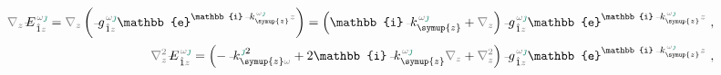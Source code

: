 \begin{subequations} \label{eq:plane_wave_basis-partial_z}
\begin{align}
	\mathcolor{gray}{\nabla_z} \xint{\mathcolor{gray}{-}}{30}{E}^{\;\!\mathcolor{gray}{\omega} \textcolor{PineGreen}{\jmath}}_{\;\! \hat{1} \mathcolor{gray}{z}} = \mathcolor{gray}{\nabla_z} \left( \xint{{}^{}_{\mathcolor{gray}{-}}}{10}{g}^{\;\!\mathcolor{gray}{\omega} \textcolor{PineGreen}{\jmath}}_{\;\! \hat{1} \mathcolor{gray}{z}} \mathbb{e}^{\mathbb{i} \xint{\begin{smallmatrix} ~ \\ {}^{}_{\mathcolor{gray}{-}} \\ ~ \end{smallmatrix}}{15}{k}_{\symup{z}}^{\;\! \mathcolor{gray}{\omega} \textcolor{PineGreen}{\jmath}} \mathcolor{gray}{z}} \right) = \left( \mathbb{i} \xint{\begin{smallmatrix} ~ \\ {}^{}_{\mathcolor{gray}{-}} \\ ~ \end{smallmatrix}}{15}{k}_{\symup{z}}^{\;\! \mathcolor{gray}{\omega} \textcolor{PineGreen}{\jmath}} + \mathcolor{gray}{\nabla_z} \right) \xint{{}^{}_{\mathcolor{gray}{-}}}{10}{g}^{\;\!\mathcolor{gray}{\omega} \textcolor{PineGreen}{\jmath}}_{\;\! \hat{1} \mathcolor{gray}{z}} \mathbb{e}^{\mathbb{i} \xint{\begin{smallmatrix} ~ \\ {}^{}_{\mathcolor{gray}{-}} \\ ~ \end{smallmatrix}}{15}{k}_{\symup{z}}^{\;\! \mathcolor{gray}{\omega} \textcolor{PineGreen}{\jmath}} \mathcolor{gray}{z}} ~, \label{eq:plane_wave_basis-dz} \\
	\mathcolor{gray}{\nabla_z^2} \xint{\mathcolor{gray}{-}}{30}{E}^{\;\!\mathcolor{gray}{\omega} \textcolor{PineGreen}{\jmath}}_{\;\! \hat{1} \mathcolor{gray}{z}} = \left( - \xint{\begin{smallmatrix} ~ \\ {}^{}_{\mathcolor{gray}{-}} \\ ~ \end{smallmatrix}}{15}{k}_{\symup{z} \mathcolor{gray}{\omega}}^{\;\! \textcolor{PineGreen}{\jmath} 2} + 2 \mathbb{i} \xint{\begin{smallmatrix} ~ \\ {}^{}_{\mathcolor{gray}{-}} \\ ~ \end{smallmatrix}}{15}{k}_{\symup{z}}^{\;\! \mathcolor{gray}{\omega} \textcolor{PineGreen}{\jmath}} \mathcolor{gray}{\nabla_z} + \mathcolor{gray}{\nabla_z^2} \right) \xint{{}^{}_{\mathcolor{gray}{-}}}{10}{g}^{\;\!\mathcolor{gray}{\omega} \textcolor{PineGreen}{\jmath}}_{\;\! \hat{1} \mathcolor{gray}{z}} \mathbb{e}^{\mathbb{i} \xint{\begin{smallmatrix} ~ \\ {}^{}_{\mathcolor{gray}{-}} \\ ~ \end{smallmatrix}}{15}{k}_{\symup{z}}^{\;\! \mathcolor{gray}{\omega} \textcolor{PineGreen}{\jmath}} \mathcolor{gray}{z}} ~, \label{eq:plane_wave_basis-ddz}
\end{align}
\end{subequations}
